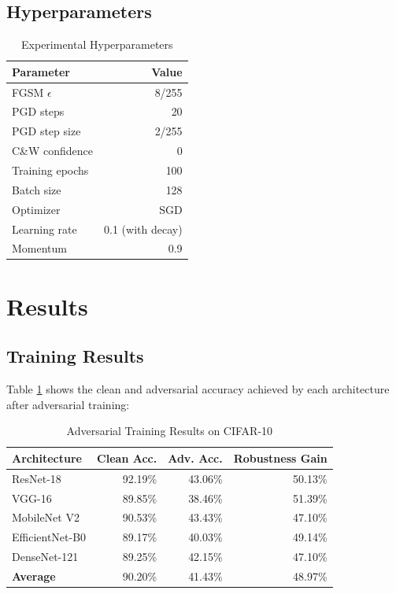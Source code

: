 \documentclass[10pt,conference]{IEEEtran}
\begin{document}
\subsection{Hyperparameters}

\begin{table}[h]
\centering
\caption{Experimental Hyperparameters}
\begin{tabular}{lr}
\toprule
\textbf{Parameter} & \textbf{Value} \\
\midrule
FGSM $\epsilon$ & 8/255 \\
PGD steps & 20 \\
PGD step size & 2/255 \\
C\&W confidence & 0 \\
Training epochs & 100 \\
Batch size & 128 \\
Optimizer & SGD \\
Learning rate & 0.1 (with decay) \\
Momentum & 0.9 \\
\bottomrule
\end{tabular}
\end{table}

\section{Results}
\label{sec:results}

\subsection{Training Results}

Table \ref{tab:training} shows the clean and adversarial accuracy achieved by each architecture after adversarial training:

\begin{table}[h]
\centering
\caption{Adversarial Training Results on CIFAR-10}
\label{tab:training}
\begin{tabular}{lrr|r}
\toprule
\textbf{Architecture} & \textbf{Clean Acc.} & \textbf{Adv. Acc.} & \textbf{Robustness Gain} \\
\midrule
ResNet-18 & 92.19\% & 43.06\% & 50.13\% \\
VGG-16 & 89.85\% & 38.46\% & 51.39\% \\
MobileNet V2 & 90.53\% & 43.43\% & 47.10\% \\
EfficientNet-B0 & 89.17\% & 40.03\% & 49.14\% \\
DenseNet-121 & 89.25\% & 42.15\% & 47.10\% \\
\midrule
\textbf{Average} & 90.20\% & 41.43\% & 48.97\% \\
\bottomrule
\end{tabular}
\end{table}
\end{document}
